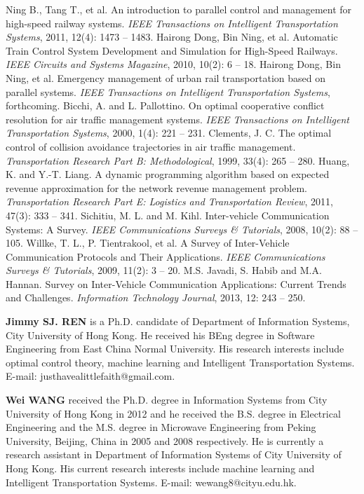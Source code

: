 \documentclass[12pt,onecolumn,twoside]{JCTA}
\theoremstyle{mystyle}
\begin{document}
\begin{thebibliography}{99}
Ning B., Tang T., et al. An introduction to parallel control and management for high-speed railway systems. \textit{IEEE Transactions on Intelligent Transportation Systems}, 2011, 12(4): 1473 -- 1483.
Hairong Dong, Bin Ning, et al. Automatic Train Control System Development and Simulation for High-Speed Railways. \textit{IEEE Circuits and Systems Magazine}, 2010, 10(2): 6 -- 18.
Hairong Dong, Bin Ning, et al. Emergency management of urban rail transportation based on parallel systems. \textit{IEEE Transactions on Intelligent Transportation Systems}, forthcoming.
Bicchi, A. and L. Pallottino. On optimal cooperative conflict resolution for air traffic management systems. \textit{IEEE Transactions on Intelligent Transportation Systems}, 2000, 1(4): 221  -- 231.
Clements, J. C. The optimal control of collision avoidance trajectories in air traffic management. \textit{Transportation Research Part B: Methodological}, 1999, 33(4): 265  -- 280.
Huang, K. and Y.-T. Liang. A dynamic programming algorithm based on expected revenue approximation for the network revenue management problem. \textit{Transportation Research Part E: Logistics and Transportation Review}, 2011, 47(3): 333  -- 341.
Sichitiu, M. L. and M. Kihl. Inter-vehicle Communication Systems: A Survey. \textit{IEEE Communications Surveys \& Tutorials}, 2008, 10(2): 88  -- 105.
Willke, T. L., P. Tientrakool, et al. A Survey of Inter-Vehicle Communication Protocols and Their Applications. \textit{IEEE Communications Surveys \& Tutorials}, 2009, 11(2): 3  -- 20.
M.S. Javadi, S. Habib and M.A. Hannan. Survey on Inter-Vehicle Communication Applications: Current Trends and Challenges. \textit{Information Technology Journal}, 2013, 12: 243  -- 250.
\end{thebibliography}


\vspace{.5\baselineskip} {\selectfont\scriptsize                        {\bf Jimmy SJ. REN} is a Ph.D. candidate of Department of Information Systems, City University of Hong Kong. He received his BEng degree in Software Engineering from East China Normal University. His research interests include optimal control theory, machine learning and Intelligent Transportation Systems. E-mail: justhavealittlefaith@gmail.com.
\par}

\vspace{.5\baselineskip} {\selectfont\scriptsize
{\bf Wei WANG} received the Ph.D. degree in Information Systems from City University of Hong Kong in 2012 and he received the B.S. degree in Electrical Engineering and the M.S. degree in Microwave Engineering from Peking University, Beijing, China in 2005 and 2008 respectively.  
He is currently a research assistant in Department of Information Systems of City University of Hong Kong. His current research interests include machine learning and Intelligent Transportation Systems. E-mail: wewang8@cityu.edu.hk.
\par}
\end{document}
